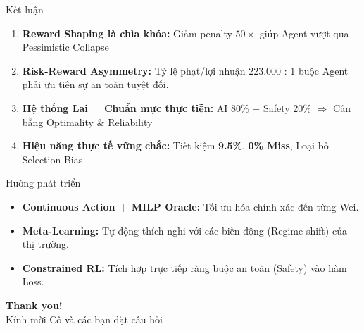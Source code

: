 \documentclass[aspectratio=169, 12pt, xcolor=table]{beamer}
\begin{document}
\begin{frame}{Kết luận}
  \begin{enumerate}
    \item \textbf{Reward Shaping là chìa khóa:}
    Giảm penalty $50\times$ giúp Agent vượt qua Pessimistic Collapse

    \item \textbf{Risk-Reward Asymmetry:}
    Tỷ lệ phạt/lợi nhuận 223.000 : 1 buộc Agent phải ưu tiên sự an toàn tuyệt đối.

    \item \textbf{Hệ thống Lai = Chuẩn mực thực tiễn:}
    AI 80\% + Safety 20\% $\Rightarrow$ Cân bằng Optimality \& Reliability

    \item \textbf{Hiệu năng thực tế vững chắc:}
    Tiết kiệm \textbf{9.5\%}, \textbf{0\% Miss}, Loại bỏ Selection Bias
  \end{enumerate}

  \vspace{1em}
  \begin{block}{Hướng phát triển}
    \begin{itemize}
      \item \textbf{Continuous Action + MILP Oracle:} Tối ưu hóa chính xác đến từng Wei.
      \item \textbf{Meta-Learning:} Tự động thích nghi với các biến động (Regime shift) của thị trường.
      \item \textbf{Constrained RL:} Tích hợp trực tiếp ràng buộc an toàn (Safety) vào hàm Loss.
    \end{itemize}
  \end{block}
\end{frame}

\begin{frame}[plain]
  \centering
  \vspace{3cm}
  {\Huge\textbf{Thank you!}}\\[1em]
  {\Large Kính mời Cô và các bạn đặt câu hỏi}\\[2em]
\end{frame}

\appendix
\end{document}

